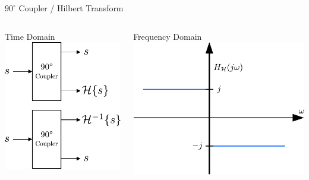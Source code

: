 \documentclass{beamer}
\begin{document}
\begin{frame}{$90^\circ$ Coupler / Hilbert Transform}
  \begin{columns}[T]
    \begin{column}{.5\textwidth}
      \begin{block}{Time Domain}
        \includegraphics[width=\textwidth]{figures/90deg_coupler_hilbert}
      \end{block}
    \end{column}
    \begin{column}{.5\textwidth}
      \begin{block}{Frequency Domain}
        \includegraphics[width=\textwidth]{figures/hilbert}
      \end{block}
    \end{column}
  \end{columns}
\end{frame}
\end{document}

